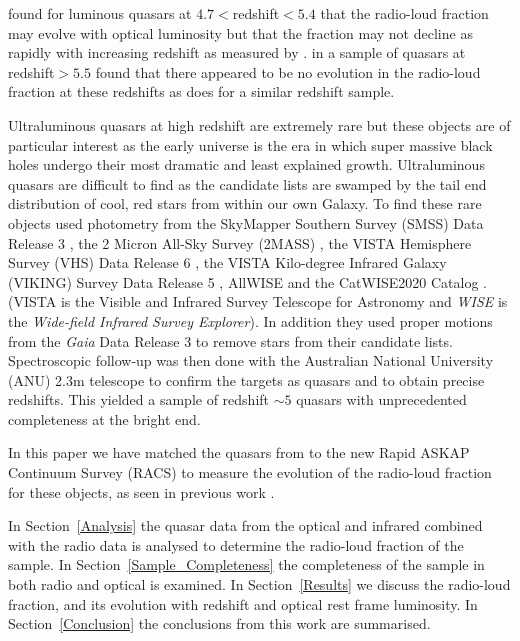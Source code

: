 \documentclass[a4paper,fleqn,usenatbib]{mnras}
\begin{document}
\citet{yang16} found for luminous quasars at $4.7<$redshift$<5.4$ that the {radio-loud fraction} may evolve with optical luminosity but that the fraction may not decline as rapidly with increasing redshift as measured by \citet{jiang07}.  \citet{banados15} in a sample of quasars at redshift$> 5.5$ found that there appeared to be no evolution in the radio-loud fraction at these redshifts as does \citet{liu21} for a similar redshift sample.

Ultraluminous quasars at high redshift are extremely rare but these objects are of particular interest as  the early universe is the era in which super massive black holes undergo their most dramatic and least explained growth.  Ultraluminous quasars are difficult to find as the {candidate lists} are swamped by the tail end distribution of cool, red stars from within our own Galaxy.  To find these rare objects \citet{onken22} used photometry from the SkyMapper Southern Survey (SMSS) Data Release 3 \citep{wolf18,onken19}, the 2 Micron All-Sky Survey (2MASS) \citep{skrutskie06}, the VISTA Hemisphere Survey (VHS) Data Release 6 \citep{mcmahon13}, the VISTA Kilo-degree Infrared Galaxy (VIKING) Survey Data Release 5 \citep{edge13},  AllWISE \citep{cutri21} and the CatWISE2020 Catalog \citep{marocco21}.  {(VISTA is the Visible and Infrared Survey Telescope for Astronomy and \emph{WISE} is the \emph{Wide-field Infrared Survey Explorer}).}  In addition they used proper motions from the {\it Gaia} Data Release 3 \citep{gaiacollaboration21} to remove stars from their candidate lists.  Spectroscopic {follow-up} was then done with the {Australian National University (ANU)} 2.3m telescope to confirm the targets as quasars and to obtain precise redshifts.  This yielded a sample of redshift $\sim5$ quasars with unprecedented completeness at the bright end.  

In this paper we have matched the quasars from \citet{onken22} to the new Rapid ASKAP Continuum Survey (RACS) \citep{mcconnell20,hale21} to measure the evolution of the radio-loud fraction for these objects,  as seen in previous work  \citep[e.g][]{jiang07}.  

In Section~\ref{Analysis} the quasar data from the optical and infrared combined with the radio data is analysed {to determine the radio-loud fraction of the sample}.  In Section~\ref{Sample_Completeness} the completeness of the sample in both radio and optical is examined.  In Section~\ref{Results} we discuss the radio-loud fraction, and its evolution with redshift and optical rest frame luminosity.  In Section~\ref{Conclusion} the conclusions from this work are summarised.
\end{document}
